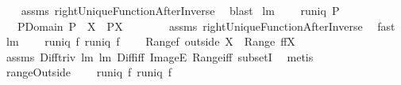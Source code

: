 \begin{isabellebody}
%
\isadelimproof
\ \ %
\endisadelimproof
%
\isatagproof
{}\isamarkupfalse%
\ assms\ rightUniqueFunctionAfterInverse\ \isamarkupfalse%
\ blast%
\endisatagproof
{\isafoldproof}%
%
\isadelimproof
\isanewline
%
\endisadelimproof
\isanewline
{}\isamarkupfalse%
\ lm{}{}{}{\isacharcolon}\ \isanewline
\ \ \ {\isachardoublequoteopen}runiq\ {\isacharparenleft}P{\isasyminverse}{\isacharparenright}{\isachardoublequoteclose}\isanewline
\ \ \ {\isachardoublequoteopen}{\isacharparenleft}P{\isacharbackquote}{\isacharbackquote}{\isacharparenleft}{\isacharparenleft}Domain\ P{\isacharparenright}\ {\isacharminus}\ X{\isacharparenright}{\isacharparenright}\ {\isasyminter}\ {\isacharparenleft}P{\isacharbackquote}{\isacharbackquote}X{\isacharparenright}\ \ {\isacharequal}\ \ {\isacharbraceleft}{\isacharbraceright}{\isachardoublequoteclose}\isanewline
%
\isadelimproof
\ \ %
\endisadelimproof
%
\isatagproof
{}\isamarkupfalse%
\ assms\ rightUniqueFunctionAfterInverse\ \isamarkupfalse%
\ fast%
\endisatagproof
{\isafoldproof}%
%
\isadelimproof
\isanewline
%
\endisadelimproof
\isanewline
{}\isamarkupfalse%
\ lm{}{}{}{\isacharcolon}\ \isanewline
\ \ \ {\isachardoublequoteopen}runiq\ f{\isachardoublequoteclose}\ {\isachardoublequoteopen}runiq\ {\isacharparenleft}f{\isacharcircum}{\isacharminus}{}{\isacharparenright}{\isachardoublequoteclose}\ \isanewline
\ \ \ {\isachardoublequoteopen}Range{\isacharparenleft}f\ outside\ X{\isacharparenright}\ {\isasymsubseteq}\ {\isacharparenleft}Range\ f{\isacharparenright}{\isacharminus}{\isacharparenleft}f{\isacharbackquote}{\isacharbackquote}X{\isacharparenright}{\isachardoublequoteclose}\ \isanewline
%
\isadelimproof
\ \ %
\endisadelimproof
%
\isatagproof
{}\isamarkupfalse%
\ assms\ Diff{\isacharunderscore}triv\ lm{}{}{}\ lm{}{}{}\ Diff{\isacharunderscore}iff\ ImageE\ Range{\isacharunderscore}iff\ subsetI\ \isamarkupfalse%
\ metis%
\endisatagproof
{\isafoldproof}%
%
\isadelimproof
\ \isanewline
%
\endisadelimproof
\isanewline
{}\isamarkupfalse%
\ rangeOutside{\isacharcolon}\ \isanewline
\ \ \ {\isachardoublequoteopen}runiq\ f{\isachardoublequoteclose}\ {\isachardoublequoteopen}runiq\ {\isacharparenleft}f{\isacharcircum}{\isacharminus}{}{\isacharparenright}{\isachardoublequoteclose}\ \isanewline

\end{isabellebody}
